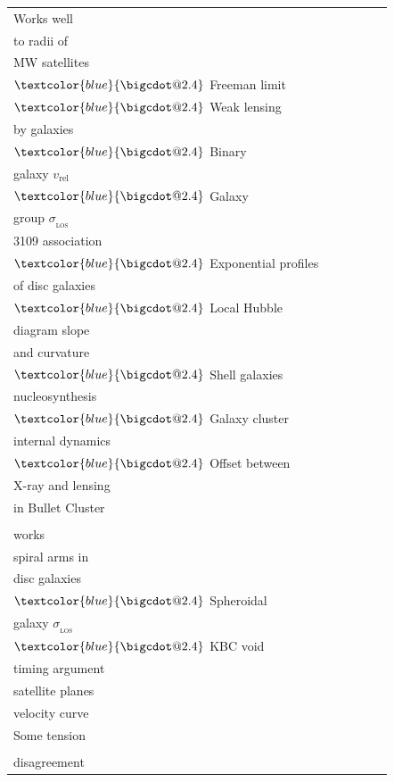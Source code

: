 \documentclass[fleqn,usenatbib,useAMS,onecolumn]{mnras} %
\makeatletter
\DeclareRobustCommand*\bigcdot{\mathpalette\bigcdot@{2.4}}
\DeclareRobustCommand*\bigcdot@[2]{\mathbin{\vcenter{\hbox{\scalebox{#2}{$\m@th#1\bullet$}}}}}
\makeatother
\begin{document}
\begin{table}
\begin{tabular}{llllll}
		Works well & \makecell{$\textcolor{blue}{\bigcdot}$ Tidal limit \\ to radii of \\ MW satellites \\ $\textcolor{blue}{\bigcdot}$ Freeman limit \\ $\textcolor{blue}{\bigcdot}$ Weak lensing \\ by galaxies \\ $\textcolor{blue}{\bigcdot}$ Binary \\ galaxy $v_{\text{rel}}$ \\ $\textcolor{blue}{\bigcdot}$ Galaxy \\ group $\sigma_{_\text{LOS}}$} & \makecell{$\textcolor{blue}{\bigcdot}$ RV of NGC \\ 3109 association} & \makecell{$\textcolor{blue}{\bigcdot}$ Weakly barred M33 \\ $\textcolor{blue}{\bigcdot}$ Exponential profiles \\ of disc galaxies \\ $\textcolor{blue}{\bigcdot}$ Local Hubble \\ diagram slope \\ and curvature \\ $\textcolor{blue}{\bigcdot}$ Shell galaxies} & \makecell{$\textcolor{blue}{\bigcdot}$ Big Bang \\ nucleosynthesis \\ $\textcolor{blue}{\bigcdot}$ Galaxy cluster \\ internal dynamics \\ $\textcolor{blue}{\bigcdot}$ Offset between \\ X-ray and lensing \\ in Bullet Cluster} & \makecell{} \\ \hline
		\makecell{Plausibly \\ works} & \makecell{$\textcolor{blue}{\bigcdot}$ Number of \\ spiral arms in \\ disc galaxies \\ $\textcolor{blue}{\bigcdot}$ Spheroidal \\ galaxy $\sigma_{_\text{LOS}}$ \\ $\textcolor{blue}{\bigcdot}$ KBC void} & \makecell{$\textcolor{blue}{\bigcdot}$ MW-M31 \\ timing argument} & \makecell{$\textcolor{blue}{\bigcdot}$ Local Group \\ satellite planes} & \makecell{$\textcolor{blue}{\bigcdot}$ MW escape \\ velocity curve} & \makecell{} \\ \hline
		Some tension & \makecell{} & \makecell{} & \makecell{} & \makecell{} & \makecell{} \\ \hline
		\makecell{Strong \\ disagreement} & \makecell{} & \makecell{} & \makecell{} & \makecell{} & \makecell{} \\ \hline
	\end{tabular}
	\label{MOND_overview}
\end{table}
\end{document}
